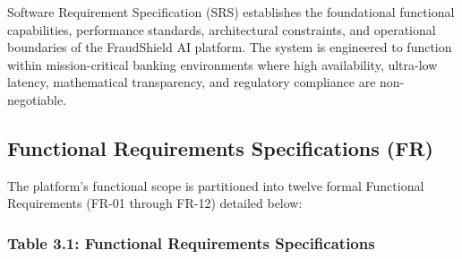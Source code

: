 \documentclass[12pt,a4paper,oneside]{report}
\begin{document}
Software Requirement Specification (SRS) establishes the foundational functional capabilities, performance standards, architectural constraints, and operational boundaries of the FraudShield AI platform. The system is engineered to function within mission-critical banking environments where high availability, ultra-low latency, mathematical transparency, and regulatory compliance are non-negotiable.


\subsection{Functional Requirements Specifications (FR)}

The platform's functional scope is partitioned into twelve formal Functional Requirements (FR-01 through FR-12) detailed below:


\subsubsection{Table 3.1: Functional Requirements Specifications}
\end{document}
